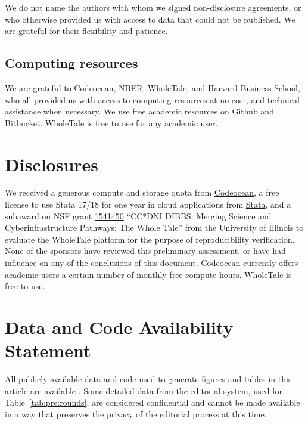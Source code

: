 We do not name the authors with whom we signed non-disclosure agreements, or who otherwise provided us with access to data that could not be published. We are grateful for their flexibility and patience.

\subsection{Computing resources}
\label{app:3rdparty-computing}

We are grateful to Codeocean, NBER, WholeTale, and Harvard Business School, who all provided us with access to computing resources at no cost, and technical assistance when necessary. We use free academic resources on Github and Bitbucket. WholeTale is free to use for any academic user.


\section{Disclosures}
\label{sec:disclosure}

We received a generous compute and storage quota from \href{https://codeocean.com/}{Codeocean}, a free license to use Stata 17/18 for one year in cloud applications from \href{https://stata.com/}{Stata}, and a subaward on NSF grant \href{https://nsf.gov/awardsearch/showAward?AWD_ID=1541450&HistoricalAwards=false}{1541450} ``CC*DNI DIBBS: Merging Science and Cyberinfrastructure Pathways: The Whole Tale'' from the University of Illinois to evaluate the WholeTale platform for the purpose of reproducibility verification. None of the sponsors have reviewed this preliminary assessment, or have had influence on any of the conclusions of this document. Codeocean currently offers academic users a certain number of monthly free compute hours. WholeTale is free to use.


\section{Data and Code Availability Statement}
\label{sec:dcas}

All publicly available data and code used to generate figures and tables in this article are available \citep{report2023data,E117876V5}. Some detailed data from the editorial system, used for Table~\ref{tab:pre:rounds}, are considered confidential and cannot be made available in a way that preserves the privacy of the editorial process at this time.
